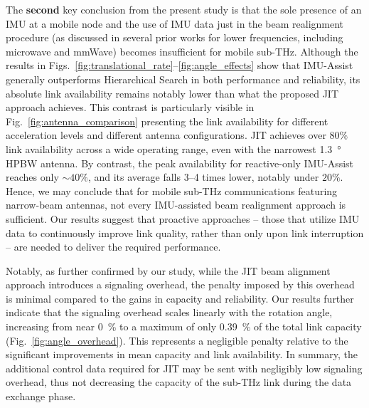 \documentclass[fleqn,10pt]{wlscirep}
\begin{document}
The \textbf{second} key conclusion from the present study is that the sole presence of an IMU at a mobile node and the use of IMU data just in the beam realignment procedure (as discussed in several prior works for lower frequencies, including microwave and mmWave) becomes insufficient for mobile sub-THz. Although the results in Figs.~\ref{fig:translational_rate}--\ref{fig:angle_effects} show that IMU-Assist generally outperforms Hierarchical Search in both performance and reliability, its absolute link availability remains notably lower than what the proposed JIT approach achieves. This contrast is particularly visible in Fig.~\ref{fig:antenna_comparison} presenting the link availability for different acceleration levels and different antenna configurations. JIT achieves over $80\%$ link availability across a wide operating range, even with the narrowest \SI{1.3}{\degree} HPBW antenna. By contrast, the peak availability for reactive-only IMU-Assist reaches only ${\sim}40\%$, and its average falls 3--4 times lower, notably under $20\%$. Hence, we may conclude that for mobile sub-THz communications featuring narrow-beam antennas, not every IMU-assisted beam realignment approach is sufficient. Our results suggest that proactive approaches -- those that utilize IMU data to continuously improve link quality, rather than only upon link interruption -- are needed to deliver the required performance.

Notably, as further confirmed by our study, while the JIT beam alignment approach introduces a signaling overhead, the penalty imposed by this overhead is minimal compared to the gains in capacity and reliability. Our results further indicate that the signaling overhead scales linearly with the rotation angle, increasing from near \SI{0}{\percent} to a maximum of only \SI{0.39}{\percent} of the total link capacity (Fig.~\ref{fig:angle_overhead}). This represents a negligible penalty relative to the significant improvements in mean capacity and link availability. In summary, the additional control data required for JIT may be sent with negligibly low signaling overhead, thus not decreasing the capacity of the sub-THz link during the data exchange phase.
\end{document}

